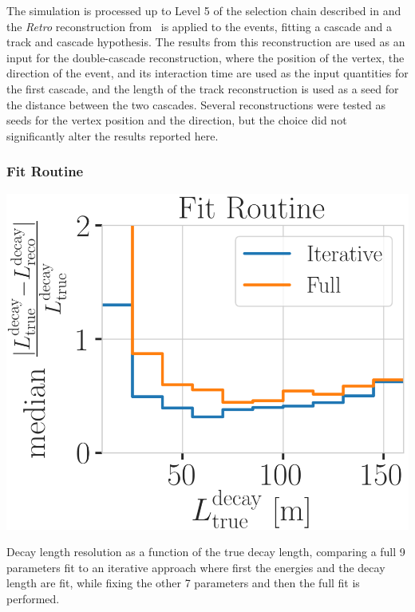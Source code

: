 The simulation is processed up to Level 5 of the selection chain described in  and the \textit{Retro} reconstruction from~ is applied to the events, fitting a cascade and a track and cascade hypothesis. The results from this reconstruction are used as an input for the double-cascade reconstruction, where the position of the vertex, the direction of the event, and its interaction time are used as the input quantities for the first cascade, and the length of the track reconstruction is used as a seed for the distance between the two cascades. Several reconstructions were tested as seeds for the vertex position and the direction, but the choice did not significantly alter the results reported here.


\subsubsection{Fit Routine}

\begin{marginfigure}
	\centering
    \includegraphics{figures/results/190605_reco_optimization/fit_routine_splitting_median_decay_length_resolution_Good + L7 + reco E1,E2 above 3_fix_y_new.png}
    \caption[Decay length resolution to optimize fit routine]{Decay length resolution as a function of the true decay length, comparing a full 9 parameters fit to an iterative approach where first the energies and the decay length are fit, while fixing the other 7 parameters and then the full fit is performed.}
\end{marginfigure}

